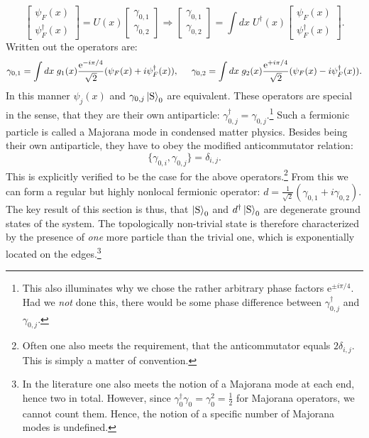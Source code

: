 \begin{equation}
\begin{bmatrix} \psi_F(x) \\ \psi_F^\dagger(x) \end{bmatrix} = U(x) \begin{bmatrix} \gamma_{0,1} \\ \gamma_{0,2} \end{bmatrix} \Rightarrow \begin{bmatrix} \gamma_{0,1} \\ \gamma_{0,2} \end{bmatrix} = \int dx \; U^\dagger(x) \begin{bmatrix} \psi_F(x) \\ \psi_F^\dagger(x) \end{bmatrix}.
\label{eq.Majoranaedgemodedef} 
\end{equation}
Written out the operators are:
\begin{equation}
\gamma_{0,1} = \int dx \; g_1(x) \frac{\text{e}^{-i\pi/4}}{\sqrt{2}}(\psi_F(x) + i\psi^\dagger_F(x)), \hspace{0.5cm} \gamma_{0,2} = \int dx \; g_2(x) \frac{\text{e}^{+i\pi/4}}{\sqrt{2}}(\psi_F(x) - i\psi^\dagger_F(x)).
\label{eq.Majoranaedgemodegeneraldef} 
\end{equation}
In this manner $\psi_j(x)$ and $\gamma_{0,j}\ket{\text{S}}_0$ are equivalent. These operators are special in the sense, that they are their own antiparticle: $\gamma_{0,j}^\dagger = \gamma_{0,j}$.\footnote{This also illuminates why we chose the rather arbitrary phase factors $\text{e}^{\pm i\pi/4}$. Had we \textit{not} done this, there would be some phase difference between $\gamma^\dagger_{0,j}$ and $\gamma_{0,j}$.} Such a fermionic particle is called a Majorana mode in condensed matter physics. Besides being their own antiparticle, they have to obey the modified anticommutator relation:
\begin{equation}
\{\gamma_{0,i}, \gamma_{0,j} \} = \delta_{i,j}. \nonumber
\end{equation}
This is explicitly verified to be the case for the above operators.\footnote{Often one also meets the requirement, that the anticommutator equals $2\delta_{i,j}$. This is simply a matter of convention.} From this we can form a regular but highly nonlocal fermionic operator: $d = \frac{1}{\sqrt{2}}(\gamma_{0,1} + i\gamma_{0,2})$. The key result of this section is thus, that $\ket{\text{S}}_0$ and $d^\dagger\ket{\text{S}}_0$ are degenerate ground states of the system. The topologically non-trivial state is therefore characterized by the presence of \textit{one} more particle than the trivial one, which is exponentially located on the edges.\footnote{In the literature one also meets the notion of a Majorana mode at each end, hence two in total. However, since $\gamma^\dagger_0\gamma_0 = \gamma_0^2 = \frac{1}{2}$ for Majorana operators, we cannot count them. Hence, the notion of a specific number of Majorana modes is undefined.}

